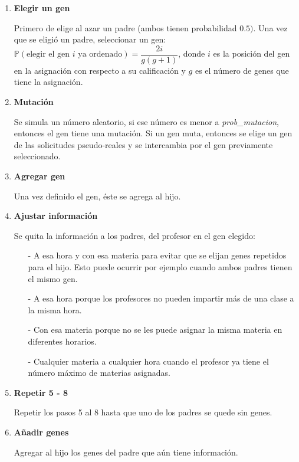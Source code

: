\begin{enumerate}
\item \textbf{Elegir un gen}

Primero de elige al azar un padre (ambos tienen probabilidad $0.5)$. Una vez que se eligió un padre, seleccionar un gen: $\mathbb{P}(\text{elegir el gen } i \text{ ya ordenado}) = \dfrac{2i}{g(g+1)}$, donde $i$ es la posición del gen en la asignación con respecto a su calificación y $g$ es el número de genes que tiene la asignación.

\item \textbf{Mutación}

Se simula un número aleatorio, si ese número es menor a \textit{prob\_mutacion}, entonces el gen tiene una mutación. Si un gen muta, entonces se elige un gen de las solicitudes pseudo-reales y se intercambia por el gen previamente seleccionado.

\item \textbf{Agregar gen}

Una vez definido el gen, éste se agrega al hijo.

\item \textbf{Ajustar información}

Se quita la información a los padres, del profesor en el gen elegido:

\begin{itemize}
\item[-] A esa hora y con esa materia para evitar que se elijan genes repetidos para el hijo. Esto puede ocurrir por ejemplo cuando ambos padres tienen el mismo gen.

\item[-] A esa hora porque los profesores no pueden impartir más de una clase a la misma hora.

\item[-] Con esa materia porque no se les puede asignar la misma materia en diferentes horarios.

\item[-] Cualquier materia a cualquier hora cuando el profesor ya tiene el número máximo de materias asignadas.
\end{itemize}

\item \textbf{Repetir 5 - 8}

Repetir los pasos 5 al 8 hasta que uno de los padres se quede sin genes.

\item \textbf{Añadir genes}

Agregar al hijo los genes del padre que aún tiene información.


\end{enumerate}
